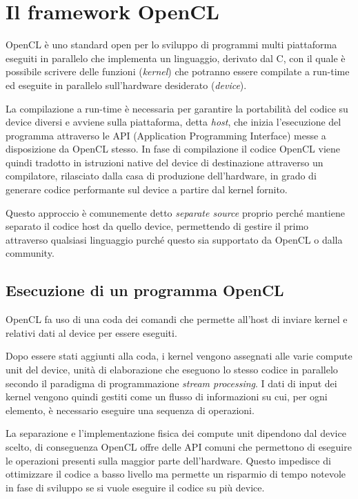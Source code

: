 \chapter{Il framework OpenCL}
\vspace{4cm}
OpenCL\cite{opencl} è uno standard open per lo sviluppo di programmi multi piattaforma eseguiti in parallelo che implementa un linguaggio, derivato dal C, con il quale è possibile scrivere delle funzioni (\textit{kernel}) che potranno essere compilate a run-time ed eseguite in parallelo sull'hardware desiderato (\textit{device}).

La compilazione a run-time è necessaria per garantire la portabilità del codice su device diversi e avviene sulla piattaforma, detta \textit{host}, che inizia l'esecuzione del programma attraverso le API (Application Programming Interface) messe a disposizione da OpenCL stesso.
In fase di compilazione il codice OpenCL viene quindi tradotto in istruzioni native del device di destinazione attraverso un compilatore, rilasciato dalla casa di produzione dell'hardware, in grado di generare codice performante sul device a partire dal kernel fornito.

Questo approccio è comunemente detto \textit{separate source} proprio perché mantiene separato il codice host da quello device, permettendo di gestire il primo attraverso qualsiasi linguaggio purché questo sia supportato da OpenCL o dalla community.

\section{Esecuzione di un programma OpenCL}
OpenCL fa uso di una coda dei comandi che permette all'host di inviare kernel e relativi dati al device per essere eseguiti.

Dopo essere stati aggiunti alla coda, i kernel vengono assegnati alle varie compute unit del device, unità di elaborazione che eseguono lo stesso codice in parallelo secondo il paradigma di programmazione \textit{stream processing}. I dati di input dei kernel vengono quindi gestiti come un flusso di informazioni su cui, per ogni elemento, è necessario eseguire una sequenza di operazioni.
 
La separazione e l'implementazione fisica dei compute unit dipendono dal device scelto, di conseguenza OpenCL offre delle API comuni che permettono di eseguire le operazioni presenti sulla maggior parte dell'hardware. Questo impedisce di ottimizzare il codice a basso livello ma permette un risparmio di tempo notevole in fase di sviluppo se si vuole eseguire il codice su più device.

